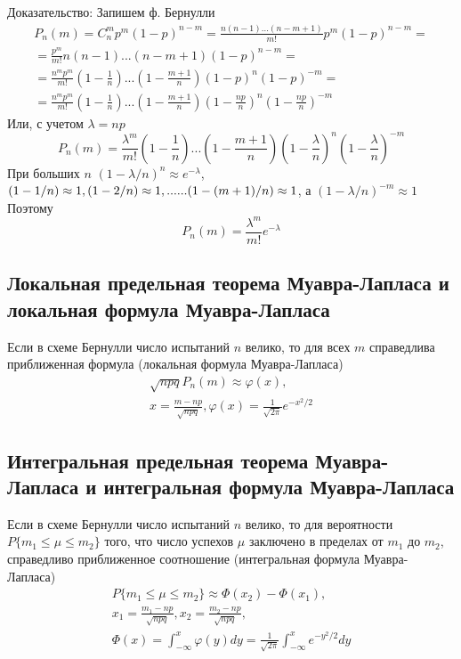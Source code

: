 \documentclass[12pt]{article}
\begin{document}
Доказательство:
Запишем ф. Бернулли
\begin{gather*}
	P_n(m) = C^m_np^m(1-p)^{n-m} = \frac{n(n-1)...(n-m+1)}{m!}p^m(1-p)^{n-m} = \\
	= \frac{p^m}{m!}n(n-1)...(n-m+1)(1-p)^{n-m} = \\
	= \frac{n^mp^m}{m!}\left(1 - \frac{1}{n}\right)...\left(1-\frac{m+1}{n}\right)(1-p)^n(1-p)^{-m} = \\
	= \frac{n^mp^m}{m!}\left(1 - \frac{1}{n}\right)...\left(1-\frac{m+1}{n}\right)\left(1-\frac{np}{n}\right)^n \left(1- \frac{np}{n}\right)^{-m}
\end{gather*}
Или, с учетом $\lambda = np$
\[P_n(m) = \frac{\lambda^m}{m!}\left(1 - \frac{1}{n}\right)...\left(1-\frac{m+1}{n}\right)\left(1-\frac{\lambda}{n}\right)^n\left(1- \frac{\lambda}{n}\right)^{-m}\]
При больших $n$ $(1-\lambda / n)^n \approx e^{-\lambda}$,
$(1 - 1 / n) \approx 1, (1 - 2 / n) \approx 1, ... \\ ... (1 - (m+1) / n) \approx 1$,
а $(1 - \lambda / n)^{-m} \approx 1$ \\
Поэтому
\[P_n(m) = \frac{\lambda^m}{m!}e^{-\lambda}\]

\subsection{Локальная предельная теорема Муавра-Лапласа и локальная формула Муавра-Лапласа}
Если в схеме Бернулли число испытаний $n$ велико,
то для всех $m$ справедлива приближенная формула (локальная формула Муавра-Лапласа)
\begin{gather*}
	\sqrt{npq}P_n(m) \approx \varphi(x), \\
	x = \frac{m-np}{\sqrt{npq}}, \varphi(x) = \frac{1}{\sqrt{2\pi}}e^{-x^2/2}
\end{gather*}

\subsection{Интегральная предельная теорема Муавра-Лапласа и интегральная формула Муавра-Лапласа}
Если в схеме Бернулли число испытаний $n$ велико,
то для вероятности $P\{m_1 \leq \mu \leq m_2\}$ того,
что число успехов $\mu$ заключено в пределах от $m_1$ до $m_2$,
справедливо приближенное соотношение (интегральная формула Муавра-Лапласа)
\begin{gather*}
	P\{m_1 \leq \mu \leq m_2\} \approx \Phi(x_2) - \Phi(x_1), \\
	x_1 = \frac{m_1 - np}{\sqrt{npq}}, x_2 = \frac{m_2 - np}{\sqrt{npq}}, \\
	\Phi(x) = \int_{-\infty}^{x}\varphi(y)dy = \frac{1}{\sqrt{2\pi}}\int_{-\infty}^{x}e^{-y^2/2}dy
\end{gather*}
\end{document}
